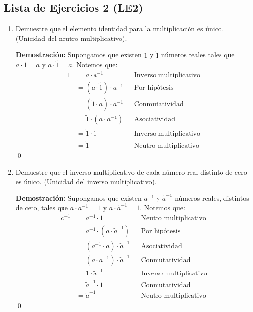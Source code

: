 \documentclass[11pt]{article}
\begin{document}
\subsection*{Lista de Ejercicios 2 (LE2)}
    \begin{enumerate}[label=\alph*)]
        \item Demuestre que el elemento identidad para la multiplicación es único. (Unicidad del neutro multiplicativo).
        
        \textbf{Demostración:} Supongamos que existen $1$ y $\tilde{1}$ números reales tales que $a\cdot 1=a$ y $a\cdot\tilde{1}=a$. Notemos que:
        \begin{align*}
        1 &= a \cdot a^{-1} && \text{Inverso multiplicativo}\\
        &= \left( a \cdot \tilde{1} \right) \cdot a^{-1} && \text{Por hipótesis}\\
        &= \left( \tilde{1} \cdot a \right) \cdot a^{-1} && \text{Conmutatividad}\\
        &= \tilde{1} \cdot \left( a \cdot a^{-1} \right) && \text{Asociatividad}\\
        &= \tilde{1} \cdot 1 && \text{Inverso multiplicativo}\\
        &= \tilde{1} && \text{Neutro multiplicativo}
        \end{align*} \qed

        \item Demuestre que el inverso multiplicativo de cada número real distinto de cero es único. (Unicidad del inverso multiplicativo).
        
        \textbf{Demostración:} Supongamos que existen $a^{-1}$ y $\tilde{a}^{-1}$ números reales, distintos de cero, tales que $a \cdot a^{-1} = 1$ y $a \cdot \tilde{a}^{-1} = 1$. Notemos que:
        \begin{align*}
        a^{-1} &= a^{-1} \cdot 1 && \text{Neutro multiplicativo} \\
        &= a^{-1} \cdot \left(a \cdot \tilde{a}^{-1} \right) && \text{Por hipótesis} \\
        &= \left( a^{-1} \cdot a \right) \cdot \tilde{a} ^{-1} && \text{Asociatividad} \\
        &= \left(a \cdot a^{-1} \right) \cdot \tilde{a}^{-1} && \text{Conmutatividad} \\
        &= 1 \cdot \tilde{a}^{-1} && \text{Inverso multiplicativo} \\
        &= \tilde{a}^{-1} \cdot 1 && \text{Conmutatividad} \\
        &= \tilde{a}^{-1} && \text{Neutro multiplicativo}
        \end{align*} \qed


\end{enumerate}
\end{document}
